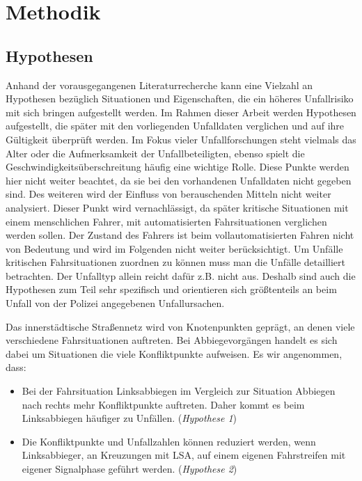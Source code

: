 
\chapter{Methodik}\label{chapter:Methodik}

\section{Hypothesen}\label{section:Hypothesen}
Anhand der vorausgegangenen Literaturrecherche kann eine Vielzahl an Hypothesen bezüglich Situationen und Eigenschaften, die ein höheres Unfallrisiko mit sich bringen aufgestellt werden. Im Rahmen dieser Arbeit werden Hypothesen aufgestellt, die später mit den vorliegenden Unfalldaten verglichen und auf ihre Gültigkeit überprüft werden. Im Fokus vieler Unfallforschungen steht vielmals das Alter oder die Aufmerksamkeit der Unfallbeteiligten, ebenso spielt die Geschwindigkeitsüberschreitung häufig eine wichtige Rolle. Diese Punkte werden hier nicht weiter beachtet, da sie bei den vorhandenen Unfalldaten nicht gegeben sind. Des weiteren wird der Einfluss von berauschenden Mitteln nicht weiter analysiert. Dieser Punkt wird vernachlässigt, da später kritische Situationen mit einem menschlichen Fahrer, mit automatisierten Fahrsituationen verglichen werden sollen. Der Zustand des Fahrers ist beim vollautomatisierten Fahren nicht von Bedeutung und wird im Folgenden nicht weiter berücksichtigt. Um Unfälle kritischen Fahrsituationen zuordnen zu können muss man die Unfälle detailliert betrachten. Der Unfalltyp allein reicht dafür z.B. nicht aus. Deshalb sind auch die Hypothesen zum Teil sehr spezifisch und orientieren sich größtenteils an beim Unfall von der Polizei angegebenen Unfallursachen.

Das innerstädtische Straßennetz wird von Knotenpunkten geprägt, an denen viele verschiedene Fahrsituationen auftreten. Bei Abbiegevorgängen handelt es sich dabei um Situationen die viele Konfliktpunkte aufweisen. Es wir angenommen, dass:

\begin{itemize}
	\item Bei der Fahrsituation Linksabbiegen im Vergleich zur Situation Abbiegen nach rechts mehr Konfliktpunkte auftreten. Daher kommt es beim Linksabbiegen häufiger zu Unfällen. (\textit{Hypothese 1})
	\item Die Konfliktpunkte und Unfallzahlen können reduziert werden, wenn Linksabbieger, an Kreuzungen mit LSA, auf einem eigenen Fahrstreifen mit eigener Signalphase geführt werden. (\textit{Hypothese 2})
\end{itemize}

